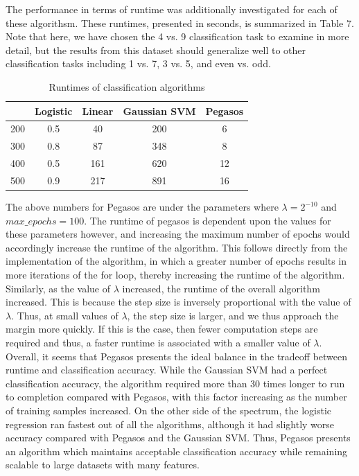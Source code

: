 \documentclass{article}
\begin{document}
The performance in terms of runtime was additionally investigated for each of these algorithsm. These runtimes, presented in seconds, is summarized in Table 7. Note that here, we have chosen the 4 vs. 9 classification task to examine in more detail, but the results from this dataset should generalize well to other classification tasks including 1 vs. 7, 3 vs. 5, and even vs. odd. \\

\begin{table}
  \begin{center}
    \begin{tabular}{ | c | c | c | c | c | }
      \hline
             & Logistic     & Linear   & Gaussian SVM & Pegasos    \\ \hline
      200    & 0.5          & 40           & 200           & 6          \\ \hline
      300    & 0.8          & 87           & 348           & 8          \\ \hline
      400    & 0.5          & 161          & 620           & 12         \\ \hline
      500    & 0.9          & 217          & 891           & 16         \\ \hline
    \end{tabular}
  \end{center}
  \caption{Runtimes of classification algorithms}
\end{table}

The above numbers for Pegasos are under the parameters where $\lambda = 2^{-10}$ and $max\_epochs = 100$. The runtime of pegasos is dependent upon the values for these parameters however, and increasing the maximum number of epochs would accordingly increase the runtime of the algorithm. This follows directly from the implementation of the algorithm, in which a greater number of epochs results in more iterations of the for loop, thereby increasing the runtime of the algorithm. Similarly, as the value of $\lambda$ increased, the runtime of the overall algorithm increased. This is because the step size is inversely proportional with the value of $\lambda$. Thus, at small values of $\lambda$, the step size is larger, and we thus approach the margin more quickly. If this is the case, then fewer computation steps are required and thus, a faster runtime is associated with a smaller value of $\lambda$. \\

Overall, it seems that Pegasos presents the ideal balance in the tradeoff between runtime and classification accuracy. While the Gaussian SVM had a perfect classification accuracy, the algorithm required more than 30 times longer to run to completion compared with Pegasos, with this factor increasing as the number of training samples increased. On the other side of the spectrum, the logistic regression ran fastest out of all the algorithms, although it had slightly worse accuracy compared with Pegasos and the Gaussian SVM. Thus, Pegasos presents an algorithm which maintains acceptable classification accuracy while remaining scalable to large datasets with many features.
\end{document}
